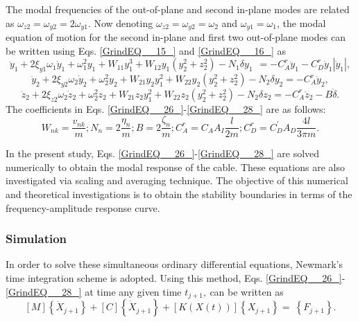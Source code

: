 \documentclass[review]{elsarticle}
\begin{document}
The modal frequencies of the out-of-plane and second in-plane modes are related as ${\omega }_{z2}={\omega }_{y2}={2\omega }_{y1}$. Now denoting ${\omega }_{z2}={\omega }_{y2}={\omega }_2$ and ${\omega }_{y1}={\omega }_1$, the modal equation of motion for the second in-plane and first two out-of-plane modes can be written using Eqs. \eqref{GrindEQ__15_} and \eqref{GrindEQ__16_} as
\begin{equation} \label{GrindEQ__26_} 
{\ddot{y}}_1+2{\xi }_{y1}{\omega }_1{\dot{y}}_1+{\omega }^2_1y_1+W_{11}y^3_1+W_{12}y_1\left(y^2_2+z^2_2\right)-N_1\delta y_1\ \ =-C^r_A{\ddot{y}}_1-C^r_D{\dot{y}}_1\left|{\dot{y}}_1\right|,  
\end{equation} 
\begin{equation} \label{GrindEQ__27_} 
{\ddot{y}}_2+2{\xi }_{y2}{\omega }_2{\dot{y}}_2+{\omega }^2_2y_2+W_{21}y_2y^2_1+W_{22}y_2\left(y^2_2+z^2_2\right)-N_2\delta y_2=-C^r_A{\ddot{y}}_2,   
\end{equation} 
\begin{equation} \label{GrindEQ__28_} 
{\ddot{z}}_2+2{\xi }_{z2}{\omega }_2{\dot{z}}_2+{\omega }^2_2z_2+W_{21}z_2y^2_1+W_{22}z_2\left(y^2_2+z^2_2\right)-N_2\delta z_2=-C^r_A{\ddot{z}}_2-B\ddot{\delta }.  
\end{equation} 
The coefficients in Eqs. \eqref{GrindEQ__26_}-\eqref{GrindEQ__28_} are as follows:
\begin{equation} \label{GrindEQ__29_}
W_{nk}=\frac{v_{nk}}{m}; N_n=2\frac{{\eta }_n}{m}; B=2\frac{{\zeta }_n}{m}; C^r_A=C_AA_I\frac{l}{2m}; C^r_D=C^{'}_DA_D\frac{4l}{3\pi m}.
\end{equation}

In the present study, Eqs. \eqref{GrindEQ__26_}-\eqref{GrindEQ__28_} are solved numerically to obtain the modal response of the cable. These equations are also investigated via scaling and averaging technique. The objective of this numerical and theoretical investigations is to obtain the stability boundaries in terms of the frequency-amplitude response curve.
\subsubsection{Simulation}
In order to solve these simultaneous ordinary differential equations, Newmark's time integration scheme is adopted. Using this method, Eqs. \eqref{GrindEQ__26_}-\eqref{GrindEQ__28_} at time any given time $t_{j+1},\ $can be written as
\begin{equation} \label{GrindEQ__30_} 
\left[M\right]\left\{{\ddot{X}}_{j+1}\right\}+\left[C\right]\left\{{\dot{X}}_{j+1}\right\}+\left[K(X\left(t\right))\right]\left\{X_{j+1}\right\}=\ \left\{F_{j+1}\right\}.  
\end{equation} 
\end{document}
